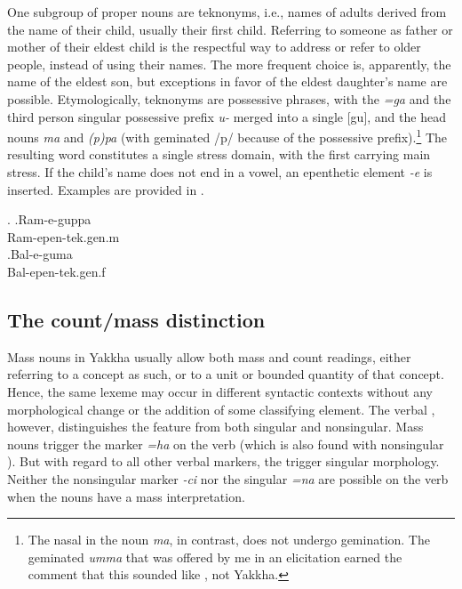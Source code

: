 One subgroup of proper nouns are teknonyms, i.e., names of adults derived from the name of their child, usually their first child. Referring to someone as father or mother of their eldest child  is the respectful way to address or refer to older people, instead of using their names. The more frequent choice is, apparently, the name of the eldest son, but exceptions in favor of the eldest daughter's name are possible. Etymologically, teknonyms are possessive phrases, with the  \emph{=ga} and the third person singular possessive prefix \emph{u-} merged into a single  [gu], and the head nouns \emph{ma}  and \emph{(p)pa}  (with geminated /p/ because of  the possessive prefix).\footnote{The nasal in the noun \emph{ma}, in contrast, does not undergo gemination. The geminated \emph{umma} that was offered by me in an elicitation earned the comment that this sounded like , not Yakkha.} The resulting word constitutes a single stress domain, with the first  carrying main stress. If the child's name does not end in a vowel, an epenthetic element \emph{-e} is inserted. Examples are provided in \Next. 

\ex. \ag.Ram-e-guppa\\
		 Ram{\sc -epen-tek.gen.m}\\
 	\bg.Bal-e-guma\\
		Bal{\sc -epen-tek.gen.f}\\
	
\subsection{The count/mass distinction}\label{lex-noun-4}

Mass nouns in Yakkha usually allow both mass and count readings, either referring to a concept as such, or to a unit or bounded quantity of that concept. Hence, the same lexeme may occur in different syntactic contexts without any morphological change or the addition of some classifying element. The verbal , however, distinguishes the feature  from both singular and nonsingular. Mass nouns trigger the marker \emph{=ha} on the verb (which is also found with nonsingular ). But with regard to all other verbal markers, the  trigger singular morphology. Neither  the nonsingular marker \emph{-ci} nor the singular  \emph{=na} are possible on the verb when the nouns have a mass interpretation. 

